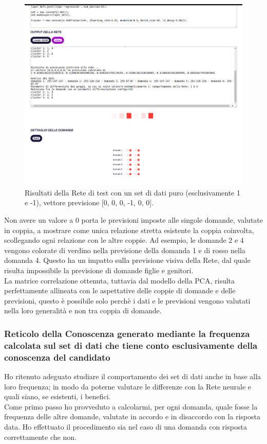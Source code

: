 \begin{figure}[H]
\centering
	\includegraphics[width=1\linewidth]{./image/RetediProva_generatorinputpuro.png}
	\caption{Risultati della Rete di test con un set di dati puro (esclusivamente 1 e -1), vettore previsione [0, 0, 0, -1, 0, 0].}
	\label{Risultati della Rete di test con un set di dati puro (esclusivamente 1 e -1), vettore previsione [0, 0, 0, -1, 0, 0].}
\end{figure}
\noindent
Non avere un valore a 0 porta le previsioni imposte alle singole domande, valutate in coppia, a mostrare come unica relazione stretta esistente la coppia coinvolta, scollegando ogni relazione con le altre coppie. Ad esempio, le domande 2 e 4 vengono colorate di verdino nella previsione della domanda 1 e di rosso nella domanda 4. Questo ha un impatto sulla previsione visiva della Rete, dal quale risulta impossibile la previsione di domande figlie e genitori.\\
La matrice correlazione ottenuta, tuttavia dal modello della PCA, risulta perfettamente allineata con le aspettative delle coppie di domande e delle previsioni, questo \`e possibile solo perch\`e i dati e le previsioni vengono valutati nella loro generalit\`a e non tra coppia di domande.


\subsubsection{Reticolo della Conoscenza generato mediante la frequenza calcolata sul set di dati che tiene conto esclusivamente della conoscenza del candidato}
\label{Reticolo della Conoscenza generato mediante la frequenza calcolata sul set di dati che tiene conto eclusivamente della conoscenza del candidato}
Ho ritenuto adeguato studiare il comportamento dei set di dati anche in base alla loro frequenza; in modo da poterne valutare le differenze con la Rete neurale e quali siano, se esistenti, i benefici.\\
Come primo passo ho provveduto a calcolarmi, per ogni domanda, quale fosse la frequenza delle altre domande, valutate in accordo e in disaccordo con la risposta data. Ho effettuato il procedimento sia nel caso di una domanda con risposta correttamente che non.


